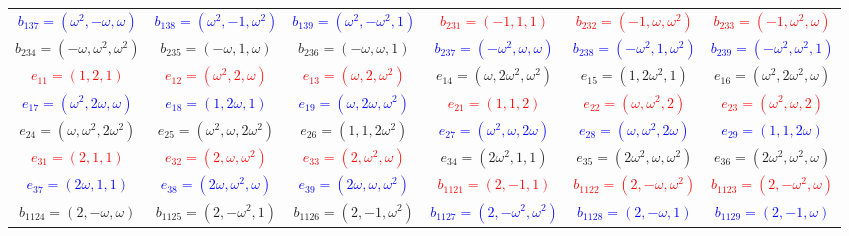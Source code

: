 \documentclass[%
  reprint,
  superscriptaddress,
  showpacs,
  showkeys,
  amsmath,amssymb,
  pra,
  longbibliography,
  floatfix,
  x11names
]{revtex4-2}
\begin{document}
\begin{table}[htbp!]
\begin{ruledtabular}
\begin{tabular}{*{6}{c}}
\textcolor{blue}{$b_{137}=(\omega^2,-\omega,\omega)$} & \textcolor{blue}{$b_{138}=(\omega^2,-1,\omega^2)$} & \textcolor{blue}{$b_{139}=(\omega^2,-\omega^2,1)$} & \textcolor{red}{$b_{231}=(-1,1,1)$} & \textcolor{red}{$b_{232}=(-1,\omega,\omega^2)$} & \textcolor{red}{$b_{233}=(-1,\omega^2,\omega)$} \\
\textcolor{green!40!black}{$b_{234}=(-\omega,\omega^2,\omega^2)$} & \textcolor{green!40!black}{$b_{235}=(-\omega,1,\omega)$} & \textcolor{green!40!black}{$b_{236}=(-\omega,\omega,1)$} & \textcolor{blue}{$b_{237}=(-\omega^2,\omega,\omega)$} & \textcolor{blue}{$b_{238}=(-\omega^2,1,\omega^2)$} & \textcolor{blue}{$b_{239}=(-\omega^2,\omega^2,1)$} \\
\textcolor{red}{$e_{11}=(1,2,1)$} & \textcolor{red}{$e_{12}=(\omega^2,2,\omega)$} & \textcolor{red}{$e_{13}=(\omega,2,\omega^2)$} & \textcolor{green!40!black}{$e_{14}=(\omega,2\omega^2,\omega^2)$} & \textcolor{green!40!black}{$e_{15}=(1,2\omega^2,1)$} & \textcolor{green!40!black}{$e_{16}=(\omega^2,2\omega^2,\omega)$} \\
\textcolor{blue}{$e_{17}=(\omega^2,2\omega,\omega)$} & \textcolor{blue}{$e_{18}=(1,2\omega,1)$} & \textcolor{blue}{$e_{19}=(\omega,2\omega,\omega^2)$} & \textcolor{red}{$e_{21}=(1,1,2)$} & \textcolor{red}{$e_{22}=(\omega,\omega^2,2)$} & \textcolor{red}{$e_{23}=(\omega^2,\omega,2)$} \\
\textcolor{green!40!black}{$e_{24}=(\omega,\omega^2,2\omega^2)$} & \textcolor{green!40!black}{$e_{25}=(\omega^2,\omega,2\omega^2)$} & \textcolor{green!40!black}{$e_{26}=(1,1,2\omega^2)$} & \textcolor{blue}{$e_{27}=(\omega^2,\omega,2\omega)$} & \textcolor{blue}{$e_{28}=(\omega,\omega^2,2\omega)$} & \textcolor{blue}{$e_{29}=(1,1,2\omega)$} \\
\textcolor{red}{$e_{31}=(2,1,1)$} & \textcolor{red}{$e_{32}=(2,\omega,\omega^2)$} & \textcolor{red}{$e_{33}=(2,\omega^2,\omega)$} & \textcolor{green!40!black}{$e_{34}=(2\omega^2,1,1)$} & \textcolor{green!40!black}{$e_{35}=(2\omega^2,\omega,\omega^2)$} & \textcolor{green!40!black}{$e_{36}=(2\omega^2,\omega^2,\omega)$} \\
\textcolor{blue}{$e_{37}=(2\omega,1,1)$} & \textcolor{blue}{$e_{38}=(2\omega,\omega^2,\omega)$} & \textcolor{blue}{$e_{39}=(2\omega,\omega,\omega^2)$} & \textcolor{red}{$b_{1121}=(2,-1,1)$} & \textcolor{red}{$b_{1122}=(2,-\omega,\omega^2)$} & \textcolor{red}{$b_{1123}=(2,-\omega^2,\omega)$} \\
\textcolor{green!40!black}{$b_{1124}=(2,-\omega,\omega)$} & \textcolor{green!40!black}{$b_{1125}=(2,-\omega^2,1)$} & \textcolor{green!40!black}{$b_{1126}=(2,-1,\omega^2)$} & \textcolor{blue}{$b_{1127}=(2,-\omega^2,\omega^2)$} & \textcolor{blue}{$b_{1128}=(2,-\omega,1)$} & \textcolor{blue}{$b_{1129}=(2,-1,\omega)$} \\

\end{tabular}
\end{ruledtabular}
\end{table}
\end{document}
